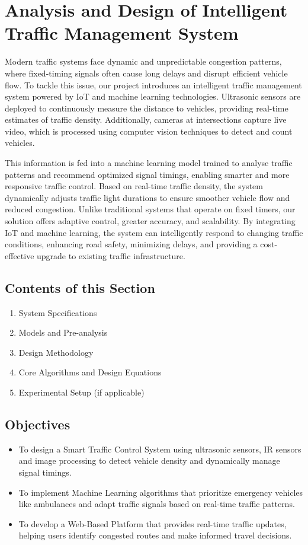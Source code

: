 \chapter{Analysis and Design of Intelligent Traffic Management System}

Modern traffic systems face dynamic and unpredictable congestion patterns, where fixed-timing signals often cause long delays and disrupt efficient vehicle flow. To tackle this issue, our project introduces an intelligent traffic management system powered by IoT and machine learning technologies. Ultrasonic sensors are deployed to continuously measure the distance to vehicles, providing real-time estimates of traffic density. Additionally, cameras at intersections capture live video, which is processed using computer vision techniques to detect and count vehicles.

This information is fed into a machine learning model trained to analyse traffic patterns and recommend optimized signal timings, enabling smarter and more responsive traffic control. Based on real-time traffic density, the system dynamically adjusts traffic light durations to ensure smoother vehicle flow and reduced congestion. Unlike traditional systems that operate on fixed timers, our solution offers adaptive control, greater accuracy, and scalability. By integrating IoT and machine learning, the system can intelligently respond to changing traffic conditions, enhancing road safety, minimizing delays, and providing a cost-effective upgrade to existing traffic infrastructure.

\vspace{0.3cm}
\section{Contents of this Section}
\begin{enumerate}
\item System Specifications
\item Models and Pre-analysis
\item Design Methodology
\item Core Algorithms and Design Equations
\item Experimental Setup (if applicable)
\end{enumerate}

\section{Objectives}
\begin{itemize}
\item To design a Smart Traffic Control System using ultrasonic sensors, IR sensors and image processing to detect vehicle density and dynamically manage signal timings.
\item To implement Machine Learning algorithms that prioritize emergency vehicles like ambulances and adapt traffic signals based on real-time traffic patterns.
\item To develop a Web-Based Platform that provides real-time traffic updates, helping users identify congested routes and make informed travel decisions.
\end{itemize}

